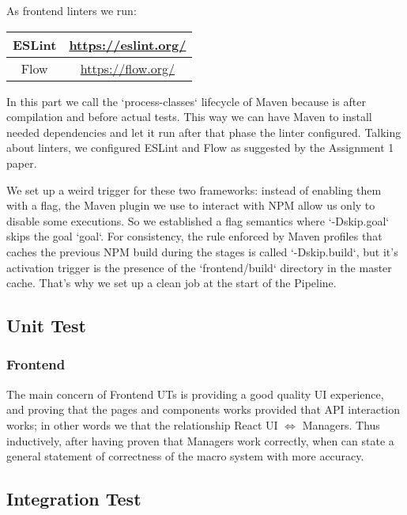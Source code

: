 \documentclass[a4paper,10pt]{scrartcl}
\begin{document}
As frontend linters we run:
\begin{center}
    \begin{tabular}{|c|c|}
        \hline
        ESLint & \href{https://eslint.org/}{https://eslint.org/} \\
        \hline
        Flow & \href{https://flow.org/}{https://flow.org/} \\
        \hline
    \end{tabular}
\end{center}

In this part we call the `process-classes` lifecycle of Maven because is after compilation and before actual tests. This way we can have Maven to install needed dependencies and let it run after that phase the linter configured. Talking about linters, we configured ESLint and Flow as suggested by the Assignment 1 paper.

We set up a weird trigger for these two frameworks: instead of enabling them with a flag, the Maven plugin we use to interact with NPM allow us only to disable some executions. So we established a flag semantics where `-Dskip.{goal}` skips the goal `goal`. For consistency, the rule enforced by Maven profiles that caches the previous NPM build during the stages is called `-Dskip.build`, but it's activation trigger is the presence of the `frontend/build` directory in the master cache. That's why we set up a clean job at the start of the Pipeline.

\subsection{Unit Test}

\subsubsection{Frontend}

The main concern of Frontend UTs is providing a good quality UI experience, and proving that the pages and components works provided that API interaction works; in other words we that the relationship React UI $\Leftrightarrow$ Managers. Thus inductively, after having proven that Managers work correctly, when can state a general statement of correctness of the macro system with more accuracy.

\subsection{Integration Test}
\end{document}
